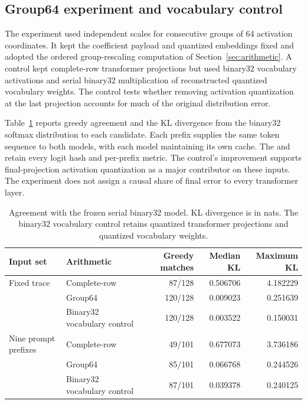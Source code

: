 \subsection{Group64 experiment and vocabulary control}

The experiment used independent scales for consecutive groups of 64 activation coordinates.  It kept the coefficient payload and quantized embeddings fixed and adopted the ordered group-rescaling computation of Section~\ref{sec:arithmetic}.  A control kept complete-row transformer projections but used binary32 vocabulary activations and serial binary32 multiplication of reconstructed quantized vocabulary weights.  The control tests whether removing activation quantization at the last projection accounts for much of the original distribution error.

Table~\ref{tab:accuracy} reports greedy agreement and the KL divergence from the binary32 softmax distribution to each candidate.  Each prefix supplies the same token sequence to both models, with each model maintaining its own cache.  The  and  retain every logit hash and per-prefix metric.  The control's improvement supports final-projection activation quantization as a major contributor on these inputs.  The experiment does not assign a causal share of final error to every transformer layer.

\begin{table}[ht]
\centering
\small
\begin{tabular}{llrrr}
\toprule
Input set & Arithmetic & Greedy matches & Median KL & Maximum KL\\
\midrule
Fixed trace & Complete-row & 87/128 & 0.506706 & 4.182229\\
 & Group64 & 120/128 & 0.009023 & 0.251639\\
 & Binary32 vocabulary control & 120/128 & 0.003522 & 0.150031\\
\midrule
Nine prompt prefixes & Complete-row & 49/101 & 0.677073 & 3.736186\\
 & Group64 & 85/101 & 0.066768 & 0.244526\\
 & Binary32 vocabulary control & 87/101 & 0.039378 & 0.240125\\
\bottomrule
\end{tabular}
\caption{Agreement with the frozen serial binary32 model.  KL divergence is in nats.  The binary32 vocabulary control retains quantized transformer projections and quantized vocabulary weights.}
\label{tab:accuracy}
\end{table}

